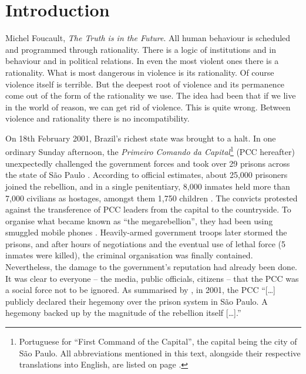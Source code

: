 \chapter{Introduction}
\label{ch:chap1}


\begin{chapquote}{Michel Foucault, \textit{The Truth is in the Future}.}
All human behaviour is scheduled and programmed through rationality. There is a logic of institutions and in behaviour and in political relations. In even the most violent ones there is a rationality. What is most dangerous in violence is its rationality. Of course violence itself is terrible. But the deepest root of violence and its permanence come out of the form of the rationality we use. The idea had been that if we live in the world of reason, we can get rid of violence. This is quite wrong. Between violence and rationality there is no incompatibility.
\end{chapquote}

On 18th February 2001, Brazil's richest state was brought to a halt. In one ordinary Sunday afternoon, the \textit{Primeiro Comando da Capital}\footnote{Portuguese for ``First Command of the Capital'', the capital being the city of S\~{a}o Paulo. All abbreviations mentioned in this text, alongside their respective translations into English, are listed on page \pageref{sec:acronyms}.} (PCC hereafter) unexpectedly challenged the government forces and took over 29 prisons across the state of S\~{a}o Paulo \citep[208]{biondi2007relacoes}. According to official estimates, about 25,000 prisoners joined the rebellion, and in a single penitentiary, 8,000 inmates held more than 7,000 civilians as hostages, amongst them 1,750 children \citep[]{terra2001rebeliao}. The convicts protested against the transference of PCC leaders from the capital to the countryside. To organise what became known as ``the megarebellion'', they had been using smuggled mobile phones \citep[]{montandon2012sistema}. Heavily-armed government troops later stormed the prisons, and after hours of negotiations and the eventual use of lethal force (5 inmates were killed), the criminal organisation was finally contained. Nevertheless, the damage to the government's reputation had already been done. It was clear to everyone -- the media, public officials, citizens -- that the PCC was a social force not to be ignored. As summarised by \citet[387]{amorim2003cv}, in 2001, the PCC ``[\dots] publicly declared their hegemony over the prison system in S\~{a}o Paulo. A hegemony backed up by the magnitude of the rebellion itself [\dots].'' 

